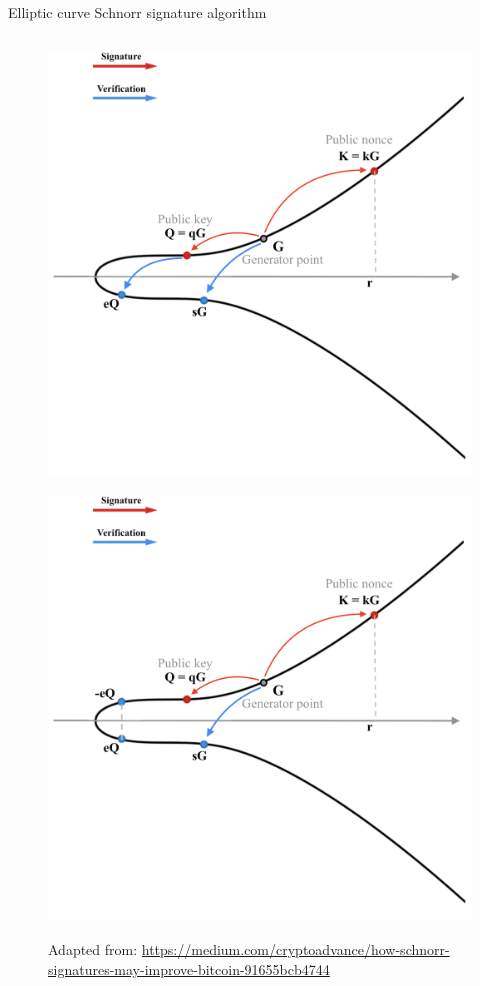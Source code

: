 \documentclass[slidescentered]{beamer}
\newcommand{\source}[1]{\caption*{\tiny Adapted from: {#1}} }
\begin{document}
\begin{frame}{Elliptic curve Schnorr signature algorithm}
\begin{columns}
\begin{column}{0.5\linewidth}
\begin{figure}
{						\source{\tiny \url{https://medium.com/cryptoadvance/how-schnorr-signatures-may-improve-bitcoin-91655bcb4744}}}
					 {\vspace*{-0.7cm}
						\hspace*{-0.9cm}
						\includegraphics[scale=0.28]{images/Schnorr2}
						\source{\tiny \url{https://medium.com/cryptoadvance/how-schnorr-signatures-may-improve-bitcoin-91655bcb4744}}}
					 {\vspace*{-0.7cm}
						\hspace*{-0.9cm}
						\includegraphics[scale=0.28]{images/Schnorr3}
}
\end{figure}
\end{column}
\end{columns}
\end{frame}
\end{document}
